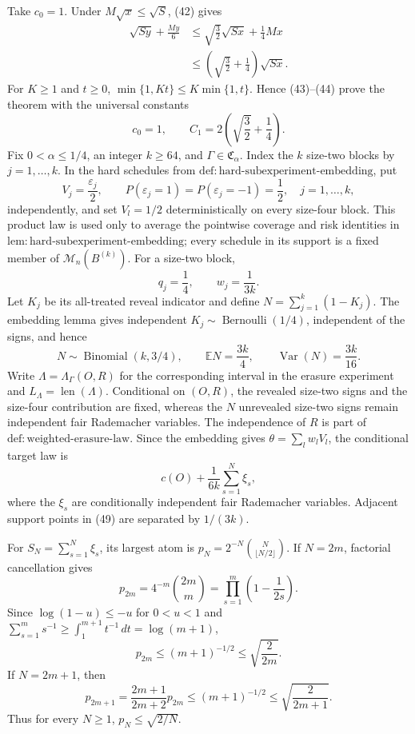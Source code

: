 Take \(c_0=1\). Under \(M\sqrt{x}\le\sqrt S\), (42) gives
\[
\begin{aligned}
 \sqrt{Sy}+\frac{My}{6}
 &\le\sqrt{\frac32}\sqrt{Sx}+\frac14Mx\\
 &\le\left(\sqrt{\frac32}+\frac14\right)\sqrt{Sx}.
\end{aligned}
\tag{44}
\]
For \(K\ge1\) and \(t\ge0\), \(\min\{1,Kt\}\le K\min\{1,t\}\). Hence (43)--(44) prove the theorem with the universal constants
\[
 c_0=1,
 \qquad
 C_1=2\left(\sqrt{\frac32}+\frac14\right).
\tag{45}
\]
Fix \(0<\alpha\le1/4\), an integer \(k\ge64\), and \(\Gamma\in\mathfrak C_\alpha\). Index the \(k\) size-two blocks by \(j=1,\ldots,k\). In the hard schedules from \(\mathrm{def{:}hard\text{-}subexperiment\text{-}embedding}\), put
\[
 V_j=\frac{\varepsilon_j}{2},\qquad
 P(\varepsilon_j=1)=P(\varepsilon_j=-1)=\frac12,
 \quad j=1,\ldots,k,
\tag{46}
\]
independently, and set \(V_l=1/2\) deterministically on every size-four block. This product law is used only to average the pointwise coverage and risk identities in \(\mathrm{lem{:}hard\text{-}subexperiment\text{-}embedding}\); every schedule in its support is a fixed member of \(\mathcal M_n(B^{(k)})\). For a size-two block,
\[
 q_j=\frac14,\qquad w_j=\frac1{3k}.
\tag{47}
\]
Let \(K_j\) be its all-treated reveal indicator and define \(N=\sum_{j=1}^k(1-K_j)\). The embedding lemma gives independent \(K_j\sim\operatorname{Bernoulli}(1/4)\), independent of the signs, and hence
\[
 N\sim\operatorname{Binomial}(k,3/4),\qquad
 \mathbb EN=\frac{3k}{4},\qquad
 \operatorname{Var}(N)=\frac{3k}{16}.
\tag{48}
\]
Write \(\Lambda=\Lambda_\Gamma(O,R)\) for the corresponding interval in the erasure experiment and \(L_\Lambda=\operatorname{len}(\Lambda)\). Conditional on \((O,R)\), the revealed size-two signs and the size-four contribution are fixed, whereas the \(N\) unrevealed size-two signs remain independent fair Rademacher variables. The independence of \(R\) is part of \(\mathrm{def{:}weighted\text{-}erasure\text{-}law}\). Since the embedding gives \(\theta=\sum_lw_lV_l\), the conditional target law is
\[
 c(O)+\frac1{6k}\sum_{s=1}^{N}\xi_s,
\tag{49}
\]
where the \(\xi_s\) are conditionally independent fair Rademacher variables. Adjacent support points in (49) are separated by \(1/(3k)\).

For \(S_N=\sum_{s=1}^N\xi_s\), its largest atom is \(p_N=2^{-N}\binom{N}{\lfloor N/2\rfloor}\). If \(N=2m\), factorial cancellation gives
\[
 p_{2m}=4^{-m}\binom{2m}{m}
       =\prod_{s=1}^m\left(1-\frac1{2s}\right).
\]
Since \(\log(1-u)\le-u\) for \(0<u<1\) and \(\sum_{s=1}^m s^{-1}\ge\int_1^{m+1}t^{-1}\,dt=\log(m+1)\),
\[
 p_{2m}\le(m+1)^{-1/2}\le\sqrt{\frac2{2m}}.
\tag{50}
\]
If \(N=2m+1\), then
\[
 p_{2m+1}=\frac{2m+1}{2m+2}p_{2m}
 \le(m+1)^{-1/2}
 \le\sqrt{\frac2{2m+1}}.
\tag{51}
\]
Thus for every \(N\ge1\), \(p_N\le\sqrt{2/N}\).


